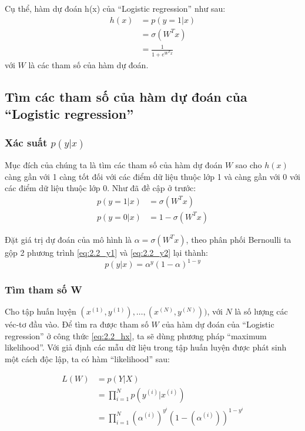 Cụ thể, hàm dự đoán h(x) của ``Logistic regression'' như sau:
\begin{equation}\label{eq:2.2_hx}
    \begin{split}
        h(x) &= p(y=1|x)\\
        &= \sigma(W^T x)\\
        &= \frac{1}{1+ e^{W^T x}}
    \end{split}
\end{equation}
với $W$ là các tham số của hàm dự đoán.


\subsection{Tìm các tham số của hàm dự đoán của ``Logistic regression''}
\subsubsection{Xác suất $p(y|x)$}
Mục đích của chúng ta là tìm các tham số của hàm dự đoán $W$ sao cho $h(x)$ càng gần với 1 càng tốt đối với các điểm dữ liệu thuộc lớp 1 và càng gần với 0 với các điểm dữ liệu thuộc lớp 0. Như đã đề cập ở trước:
\begin{align}
    p(y=1|x) &= \sigma(W^T x) \label{eq:2.2_y1}\\
    p(y=0|x) &= 1 - \sigma(W^T x)\label{eq:2.2_y2}
\end{align}

Đặt giá trị dự đoán của mô hình là $\alpha = \sigma(W^T x)$, theo phân phối Bernoulli ta gộp 2 phương trình \ref{eq:2.2_y1} và \ref{eq:2.2_y2} lại thành:
\begin{equation}
    p(y|x) = \alpha^y(1-\alpha)^{1-y}
    \label{eq:2.2_alpha}
\end{equation}
\subsubsection{Tìm tham số W}
Cho tập huấn luyện ${ (x^{(1)}, y^{(1)}), \dots, (x^{(N)}, y^{(N)}) ) }$, với $N$ là số lượng các véc-tơ đầu vào. Để tìm ra được tham số $W$ của hàm dự đoán của ``Logistic regression'' ở công thức \ref{eq:2.2_hx}, ta sẽ dùng phương pháp ``maximum likelihood''. Với giả định các mẫu dữ liệu trong tập huấn luyện được phát sinh một cách độc lập, ta có hàm ``likelihood'' sau:

\begin{equation}\label{eq:2.2_L}
    \begin{split}
        L(W) &= p(Y|X)\\
        &= \prod_{i=1}^{N} p(y^{(i)}|x^{(i)})\\
        &= \prod_{i=1}^{N} (\alpha^{(i)})^{y^i}(1-(\alpha^{(i)}))^{1-y^i}
    \end{split}
\end{equation}


